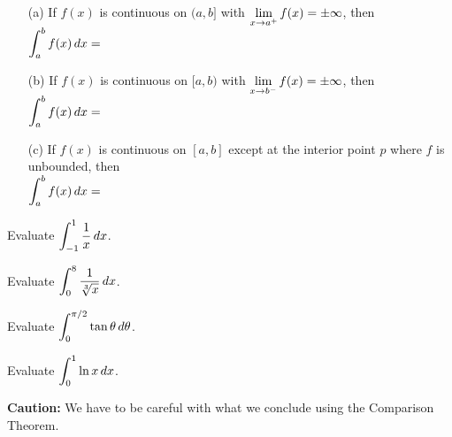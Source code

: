 \documentclass[12pt]{article}
\begin{document}
\begin{itemize}

\item[(a)] If $f(x)$ is continuous on $(a,b]$ with $\displaystyle\lim_{x\to a^+}f(x)=\pm\infty$, then\\

$\displaystyle\int_a^bf(x)\,dx=$

\vspace{40mm}

\item[(b)] If $f(x)$ is continuous on $[a,b)$ with $\displaystyle\lim_{x\to b^-}f(x)=\pm\infty$, then\\

$\displaystyle\int_a^b f(x)\,dx=$

\vspace{40mm}

\item[(c)] If $f(x)$ is continuous on $[a,b]$ except at the interior point $p$ where $f$ is unbounded, then\\

$\displaystyle\int_a^b f(x)\,dx=$

\vspace{40mm}
\end{itemize}


\newpage

\Example Evaluate $\displaystyle\int_{-1}^1\frac{1}{x}\,dx$.


\newpage

\Example Evaluate $\displaystyle\int_0^8\frac{1}{\sqrt[3]{x}}\,dx$.

\newpage

\Example Evaluate $\displaystyle\int_0^{\pi/2}\tan\theta\,d\theta$.

\newpage

\Example Evaluate $\displaystyle\int_0^1\ln x\,dx$.

\newpage


\vspace{5mm}

\textbf{Caution:} We have to be careful with what we conclude using the Comparison Theorem.
\end{document}
